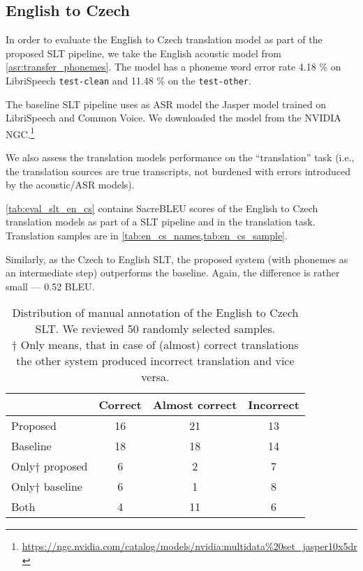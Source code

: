 \subsection{English to Czech}
In order to evaluate the English to Czech translation model as part of the proposed SLT pipeline, we take the English acoustic model from \cref{asr:transfer_phonemes}. The model has a phoneme word error rate 4.18 \% on LibriSpeech \texttt{test-clean} and 11.48 \% on the \texttt{test-other}.

The baseline SLT pipeline uses as ASR model the Jasper model trained on LibriSpeech and Common Voice. We downloaded the model from the NVIDIA NGC.\footnote{\url{https://ngc.nvidia.com/catalog/models/nvidia:multidata\%20set\_jasper10x5dr}}

We also assess the translation models performance on the ``translation'' task (i.e., the translation sources are true transcripts, not burdened with errors introduced by the acoustic/ASR models).

\cref{tab:eval_slt_en_cs} contains SacreBLEU scores of the English to Czech translation models as part of a SLT pipeline and in the translation task. Translation samples are in \cref{tab:en_cs_names,tab:en_cs_sample}.

Similarly, as the Czech to English SLT, the proposed system (with phonemes as an intermediate step) outperforms the baseline. Again, the difference is rather small --- 0.52 BLEU. 

\begin{table}[t]
	\centering
	\begin{tabular}{l|ccc}
		& Correct & Almost correct & Incorrect \\ \hline
		Proposed      & 16      & 21             & 13        \\
		Baseline      & 18       & 18             & 14        \\ \hline
		Only$\dagger$ proposed & 6       & 2              & 7         \\
		Only$\dagger$ baseline & 6       & 1              & 8        \\ \hline
		Both          & 4       & 11              & 6       
	\end{tabular}	\caption{Distribution of manual annotation of the English to Czech SLT. We reviewed 50 randomly selected samples.\\$\dagger$ Only means, that in case of (almost) correct translations the other system produced incorrect translation and vice versa.}
	\label{tab:manual_en_cs}
\end{table}


